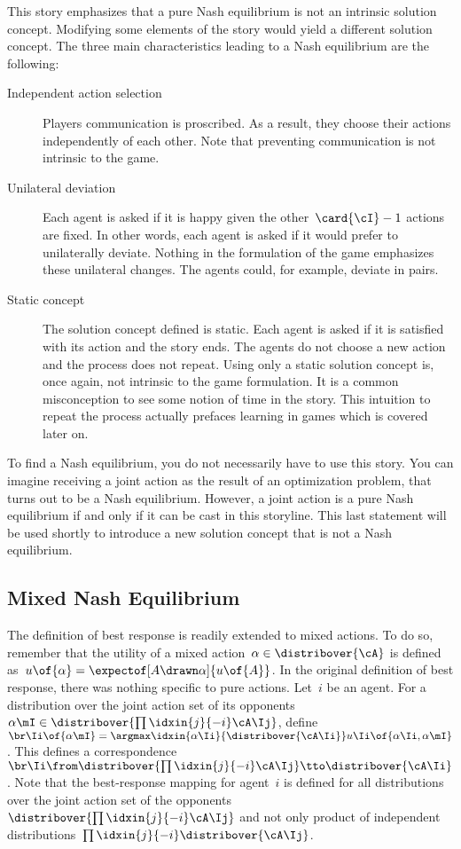 This story emphasizes that a pure Nash equilibrium is not an intrinsic solution concept.
Modifying some elements of the story would yield a different solution concept.
The three main characteristics leading to a Nash equilibrium are the following:
\begin{description}
  \item[Independent action selection]
    Players communication is proscribed.
    As a result, they choose their actions independently of each other.
    Note that preventing communication is not intrinsic to the game.
  \item[Unilateral deviation]
    Each agent is asked if it is happy given the other~\(\card{\cI} - 1\) actions are fixed.
    In other words, each agent is asked if it would prefer to unilaterally deviate.
    Nothing in the formulation of the game emphasizes these unilateral changes.
    The agents could, for example, deviate in pairs.
  \item[Static concept]
    The solution concept defined is static.
    Each agent is asked if it is satisfied with its action and the story ends.
    The agents do not choose a new action and the process does not repeat.
    Using only a static solution concept is, once again, not intrinsic to the game formulation.
    It is a common misconception to see some notion of time in the story.
    This intuition to repeat the process actually prefaces learning in games which is covered later on.
\end{description}

To find a Nash equilibrium, you do not necessarily have to use this story.
You can imagine receiving a joint action as the result of an optimization problem, that turns out to be a Nash equilibrium.
However, a joint action is a pure Nash equilibrium if and only if it can be cast in this storyline.
This last statement will be used shortly to introduce a new solution concept that is not a Nash equilibrium.

\subsection{Mixed Nash Equilibrium}

The definition of best response is readily extended to mixed actions.
To do so, remember that the utility of a mixed action~\(\alpha \in \distribover{\cA}\) is defined as~\(u \of {\alpha} = \expectof[A \drawn \alpha]{u \of {A}}\).
In the original definition of best response, there was nothing specific to pure actions.
Let~\(i\) be an agent.
For a distribution over the joint action set of its opponents~\(\alpha\mI \in \distribover{\prod\idxin{j}{-i} \cA\Ij}\), define \(\br\Ii \of {\alpha\mI} = \argmax\idxin{\alpha\Ii}{\distribover{\cA\Ii}} u\Ii \of {\alpha\Ii, \alpha\mI}\).
This defines a correspondence~\(\br\Ii \from \distribover{\prod\idxin{j}{-i} \cA\Ij} \tto \distribover{\cA\Ii}\).
Note that the best-response mapping for agent~\(i\) is defined for all distributions over the joint action set of the opponents~\(\distribover{\prod\idxin{j}{-i} \cA\Ij}\) and not only product of independent distributions~\(\prod\idxin{j}{-i} \distribover{\cA\Ij}\).

